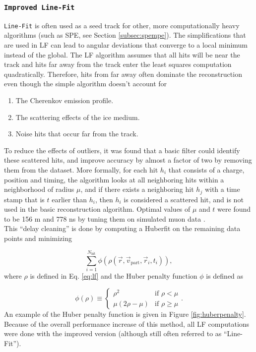 \subsubsection{\texttt{Improved Line-Fit}}
\texttt{Line-Fit} is often used as a seed track for other, more computationally heavy algorithms (such as SPE, see Section \ref{subsec:spempe}). The simplifications that are used in LF can lead to angular deviations that converge to a local minimum instead of the global. The LF algorithm assumes that all hits will be near the track and hits far away from the track enter the least squares computation quadratically. Therefore, hits from far away often dominate the reconstruction even though the simple algorithm doesn't account for 

\vspace{2mm}
\begin{enumerate}
\item The Cherenkov emission profile.
\item The scattering effects of the ice medium.
\item Noise hits that occur far from the track.
\end{enumerate}
\vspace{2mm}

\noindent To reduce the effects of outliers, it was found that a basic filter could identify these scattered hits, and improve accuracy by almost a factor of two by removing them from the dataset. More formally, for each hit $h_i$ that consists of a charge, position and timing, the algorithm looks at all neighboring hits within a neighborhood of radius $\mu$, and if there exists a neighboring hit $h_j$ with a time stamp that is $t$ earlier than $h_i$, then $h_i$ is considered a scattered hit, and is not used in the basic reconstruction algorithm. Optimal values of $\mu$ and $t$ were found to be 156 m and 778 ns by tuning them on simulated muon data \cite{Aartsen:2013bfa}.\\

\noindent This ``delay cleaning'' is done by computing a Huberfit on the remaining data points and minimizing

\begin{equation}
\sum^{N_{\textrm{hit}}}_{i=1} \phi(\rho(\vec{r},\vec{v}_\textrm{part},\vec{r}_i,t_i)),
\end{equation}
\noindent where $\rho$ is defined in Eq. \ref{eq:lf} and the Huber penalty function $\phi$ is defined as

\begin{equation}
\phi(\rho) \equiv \left\{
    \begin{array}{ll}
        \rho^2 &\textrm{if } \rho < \mu \\
        \mu\left(2\rho - \mu\right) & \textrm{if }\rho \geq \mu
    \end{array}
    \right.
    .
\end{equation}
\noindent An example of the Huber penalty function is given in Figure \ref{fig:huberpenalty}. Because of the overall performance increase of this method, all LF computations were done with the improved version (although still often referred to as ``Line-Fit'').

